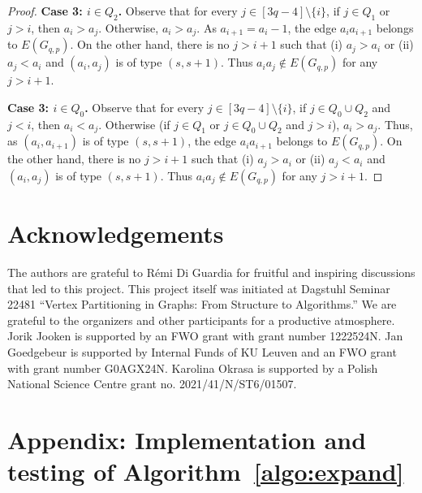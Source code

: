 \documentclass[11pt,a4paper]{article}
\theoremstyle{mystyle}
\begin{document}
\begin{proof}
\smallskip
\noindent\textbf{\boldmath Case 3: $i \in Q_2$.} Observe that for every $j \in [3q-4] \setminus \{i\}$, if $j \in Q_1$ or $j>i$, then $a_i > a_j$. Otherwise, $a_i>a_j$. As $a_{i+1}=a_i-1$, the edge $a_ia_{i+1}$ belongs to $E(G_{q,p})$. On the other hand, there is no $j >i+1$ such that (i) $a_j>a_i$ or (ii) $a_j<a_i$ and $(a_i,a_j)$ is of type $(s,s+1)$. Thus $a_ia_j \notin E(G_{q,p})$ for any $j >i+1$.

\smallskip
\noindent\textbf{\boldmath Case 3: $i \in Q_0$.}  Observe that for every $j \in [3q-4] \setminus \{i\}$, if $j \in Q_0 \cup Q_2$ and $j <i$, then $a_i < a_j$. Otherwise (if $j \in Q_1$ or $j \in Q_0 \cup Q_2$ and $j>i$), $a_i>a_j$. Thus, as $(a_i,a_{i+1})$ is of type $(s,s+1)$, the edge $a_ia_{i+1}$ belongs to $E(G_{q,p})$. On the other hand, there is no $j >i+1$ such that (i) $a_j>a_i$ or (ii) $a_j<a_i$ and $(a_i,a_j)$ is of type $(s,s+1)$. Thus $a_ia_j \notin E(G_{q,p})$ for any $j >i+1$.
\end{proof}

\section*{Acknowledgements}
The authors are grateful to R\'emi Di Guardia for fruitful and inspiring discussions that led to this project.
This project itself was initiated at Dagstuhl Seminar 22481 ``Vertex Partitioning in Graphs: From Structure to Algorithms.''
We are grateful to the organizers and other participants for a productive atmosphere.
Jorik Jooken is supported by an FWO grant with grant number 1222524N. Jan Goedgebeur is supported by Internal Funds of KU Leuven and an FWO grant with grant number G0AGX24N. 
Karolina Okrasa is supported by a Polish National Science Centre grant no. 2021/41/N/ST6/01507.








\appendix
\section*{Appendix: Implementation and testing of Algorithm~\ref{algo:expand}}\label{sec: appendix}
\end{document}

